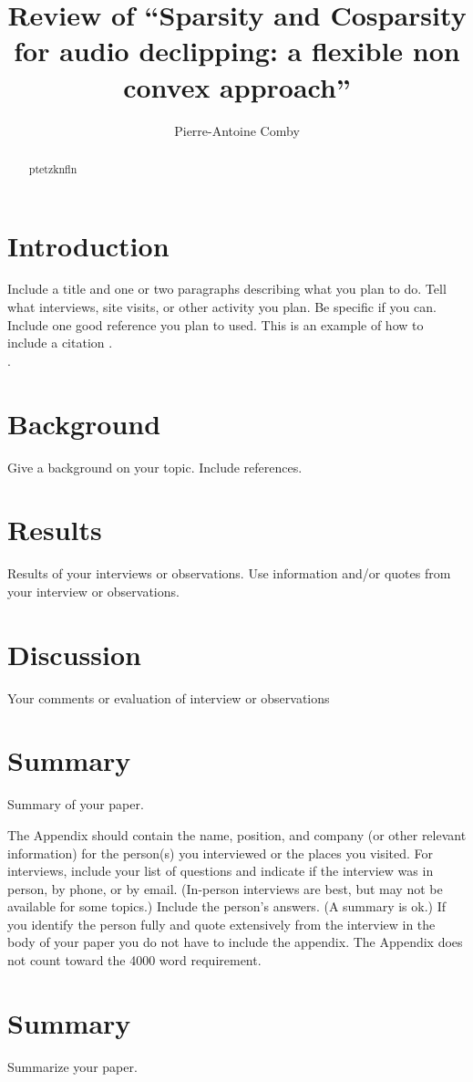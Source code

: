 \documentclass[journal]{IEEEtran}
\begin{document}
\title{Review of ``Sparsity and Cosparsity for audio declipping: a flexible non convex approach''}
\author{Pierre-Antoine Comby}%


\maketitle

\begin{abstract}
  ptetzknfln
\end{abstract}
\section{Introduction }
Include a title and one or two paragraphs describing what you plan to do. Tell what interviews, site visits, or other activity you plan. Be specific if you can. Include  one good reference you plan to used. This is an example of how to include a citation \cite{williams1989style}.  \\.

\section {Background}
Give a background on your topic. Include references.

\section{Results}
Results of your interviews or observations. Use information and/or quotes from your interview or observations.

\section{Discussion}
Your comments or evaluation of interview or observations

\section{Summary}
Summary of your paper.

\appendix
The Appendix should contain the name, position, and company (or other relevant information) for the person(s) you interviewed or the places you visited. For interviews, include your list of questions and indicate if the interview was in person, by phone, or by email. (In-person interviews are best, but may not be available for some topics.) Include the person's answers. (A summary is ok.) If you identify the person fully and quote extensively from the interview in the body of your paper you do not have to include the appendix. The Appendix does not count toward the 4000 word requirement.


\section{Summary}
Summarize your paper.




\printbibliography

\end{document}

